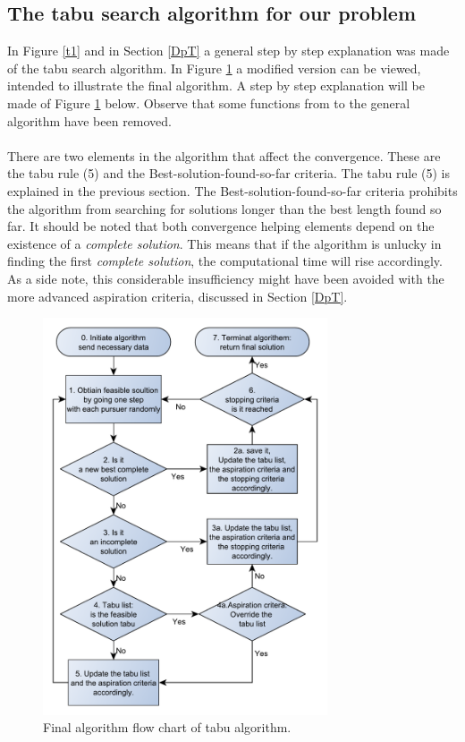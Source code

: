 \subsection{The tabu search algorithm for our problem}\label{opt}
In Figure \ref{t1} and in Section \ref{DpT} a general step by step explanation was made of the tabu search algorithm. In Figure \ref{t2} a modified version can be viewed, intended to illustrate the final algorithm. A step by step explanation will be made of Figure \ref{t2} below. Observe that some functions from to the general algorithm have been removed.\\
\\There are two elements in the algorithm that affect the convergence. These are the tabu rule (5) and the Best-solution-found-so-far criteria. The tabu rule (5) is explained in the previous section. The Best-solution-found-so-far criteria prohibits the algorithm from searching for solutions longer than the best length found so far. It should be noted that both convergence helping elements depend on the existence of a \emph{complete solution}. This means that if the algorithm is unlucky in finding the first \emph{complete solution}, the computational time will rise accordingly. As a side note, this considerable insufficiency might have been avoided with the more advanced aspiration criteria, discussed in Section \ref{DpT}.\\
\begin{figure}[!h]
\centering
\includegraphics[width=0.75\textwidth,height=0.70\textheight]{chapter_4_methods/ny_Tabu}
\caption[Final algorithm flow chart of tabu algorithm]
{Final algorithm flow chart of tabu algorithm.}
\label{t2}
\end{figure}

